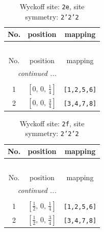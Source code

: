 \documentclass[fleqn,8pt]{jsarticle}
\begin{document}
\begin{longtable}{ccc}
\caption{Wyckoff site: {\tt 2e}, site symmetry: {\tt 2'2'2}}
 \\
 \hline \hline
No. & position & mapping \\ \hline \endfirsthead

\multicolumn{2}{l}{\tablename\ \thetable{}} \\
 \hline \hline
No. & position & mapping \\ \hline \endhead

 \hline \hline
\multicolumn{2}{r}{\footnotesize\it continued ...} \\ \endfoot

 \hline \hline
\multicolumn{2}{r}{} \\ \endlastfoot

1 & $\left[ 0,\, 0,\, \frac{1}{4} \right]$ & {\tt [1,2,5,6]} \\ \hline
2 & $\left[ 0,\, 0,\, \frac{3}{4} \right]$ & {\tt [3,4,7,8]} \\
\end{longtable}
\renewcommand{\arraystretch}{1.2}
\begin{longtable}{ccc}
\caption{Wyckoff site: {\tt 2f}, site symmetry: {\tt 2'2'2}}
 \\
 \hline \hline
No. & position & mapping \\ \hline \endfirsthead

\multicolumn{2}{l}{\tablename\ \thetable{}} \\
 \hline \hline
No. & position & mapping \\ \hline \endhead

 \hline \hline
\multicolumn{2}{r}{\footnotesize\it continued ...} \\ \endfoot

 \hline \hline
\multicolumn{2}{r}{} \\ \endlastfoot

1 & $\left[ \frac{1}{2},\, 0,\, \frac{1}{4} \right]$ & {\tt [1,2,5,6]} \\ \hline
2 & $\left[ \frac{1}{2},\, 0,\, \frac{3}{4} \right]$ & {\tt [3,4,7,8]} \\
\end{longtable}
\renewcommand{\arraystretch}{1.2}
\end{document}
